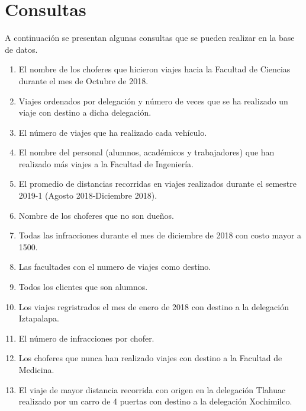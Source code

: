 \documentclass{article}
\begin{document}
\section{Consultas}
A continuación se presentan algunas consultas que se pueden realizar en la base de datos.
\begin{enumerate}
    \item El nombre de los choferes que hicieron viajes hacia la Facultad de Ciencias durante el mes de Octubre de 2018.
        
    \item Viajes ordenados por delegación y número de veces que se ha realizado un viaje con destino a dicha delegación.
    
    \item El número de viajes que ha realizado cada vehículo.
    
    \item El nombre del personal (alumnos, académicos y trabajadores) que han realizado más viajes a la Facultad de Ingeniería.
    
    \item El promedio de distancias recorridas en viajes realizados durante el semestre 2019-1 (Agosto 2018-Diciembre 2018).
    
    \item Nombre de los choferes que no son dueños.
    
    \item Todas las infracciones durante el mes de diciembre de 2018 con costo mayor a 1500.
    
    \item Las facultades con el numero de viajes como destino.
    
    \item Todos los clientes que son alumnos.
    
    \item Los viajes regristrados el mes de enero de 2018 con destino a la delegación Iztapalapa.
    
    \item El número de infracciones por chofer.
    
    \item Los choferes que nunca han realizado viajes con destino a la Facultad de Medicina.
    
    \item El viaje de mayor distancia recorrida con origen en la delegación Tlahuac realizado por un carro de 4 puertas con destino a la delegación Xochimilco.
    

\end{enumerate}
\end{document}
